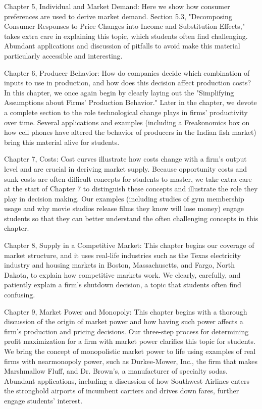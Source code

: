 Chapter 5, Individual and Market Demand: Here we show how consumer preferences are used to derive market demand. Section 5.3, "Decomposing Consumer Responses to Price Changes into Income and Substitution Effects," takes extra care in explaining this topic, which students often find challenging. Abundant applications and discussion of pitfalls to avoid make this material particularly accessible and interesting.

Chapter 6, Producer Behavior: How do companies decide which combination of inputs to use in production, and how does this decision affect production costs? In this chapter, we once again begin by clearly laying out the "Simplifying Assumptions about Firms' Production Behavior." Later in the chapter, we devote a complete section to the role technological change plays in firms' productivity over time. Several applications and examples (including a Freakonomics box on how cell phones have altered the behavior of producers in the Indian fish market) bring this material alive for students.

Chapter 7, Costs: Cost curves illustrate how costs change with a firm's output level and are crucial in deriving market supply. Because opportunity costs and sunk costs are often difficult concepts for students to master, we take extra care at the start of Chapter 7 to distinguish these concepts and illustrate the role they play in decision making. Our examples (including studies of gym membership usage and why movie studios release films they know will lose money) engage students so that they can better understand the often challenging concepts in this chapter.

Chapter 8, Supply in a Competitive Market: This chapter begins our coverage of market structure, and it uses real-life industries such as the Texas electricity industry and housing markets in Boston, Massachusetts, and Fargo, North Dakota, to explain how competitive markets work. We clearly, carefully, and patiently explain a firm's shutdown decision, a topic that students often find confusing.

Chapter 9, Market Power and Monopoly: This chapter begins with a thorough discussion of the origin of market power and how having such power affects a firm's production and pricing decisions. Our three-step process for determining profit maximization for a firm with market power clarifies this topic for students. We bring the concept of monopolistic market power to life using examples of real firms with nearmonopoly power, such as Durkee-Mower, Inc., the firm that makes Marshmallow Fluff, and Dr. Brown's, a manufacturer of specialty sodas. Abundant applications, including a discussion of how Southwest Airlines enters the stronghold airports of incumbent carriers and drives down fares, further engage students' interest.

